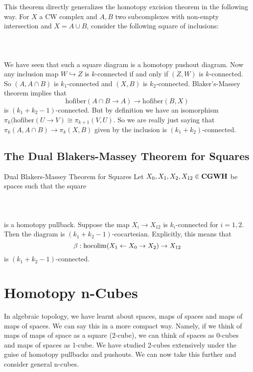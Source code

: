 \documentclass[a4paper]{article}
\begin{document}
This theorem directly generalizes the homotopy excision theorem in the following way. For $X$ a CW complex and $A,B$ two subcomplexes with non-empty intersection and $X=A\cup B$, consider the following square of inclusions: \\~\\
\\~\\
We have seen that such a square diagram is a homotopy pushout diagram. Now any inclusion map $W\hookrightarrow Z$ is $k$-connected if and only if $(Z,W)$ is $k$-connected. So $(A,A\cap B)$ is $k_1$-connected and $(X,B)$ is $k_2$-connected. Blaker's-Massey theorem implies that $$\text{hofiber}(A\cap B\to A)\to\text{hofiber}(B,X)$$ is $(k_1+k_2-1)$-connected. But by definition we have an isomorphism $\pi_k(\text{hofiber}(U\to V)\cong\pi_{k+1}(V,U)$. So we are really just saying that $\pi_k(A,A\cap B)\to\pi_k(X,B)$ given by the inclusion is $(k_1+k_2)$-connected. 

\subsection{The Dual Blakers-Massey Theorem for Squares}
\begin{thm}{Dual Blakers-Massey Theorem for Squares}{} Let $X_0,X_1,X_2,X_{12}\in\bold{CGWH}$ be spaces such that the square \\~\\
\\~\\
is a homotopy pullback. Suppose the map $X_i\to X_{12}$ is $k_i$-connected for $i=1,2$. Then the diagram is $(k_1+k_2-1)$-cocartesian. Explicitly, this means that $$\beta:\operatorname*{hocolim}(X_1\leftarrow X_0\rightarrow X_2)\to X_{12}$$ is $(k_1+k_2-1)$-connected.
\end{thm}

\pagebreak
\section{Homotopy n-Cubes}
In algebraic topology, we have learnt about spaces, maps of spaces and maps of maps of spaces. We can say this in a more compact way. Namely, if we think of maps of maps of space as a square (2-cube), we can think of spaces as 0-cubes and maps of spaces as 1-cube. We have studied 2-cubes extensively under the guise of homotopy pullbacks and pushouts. We can now take this further and consider general n-cubes. 
\end{document}
